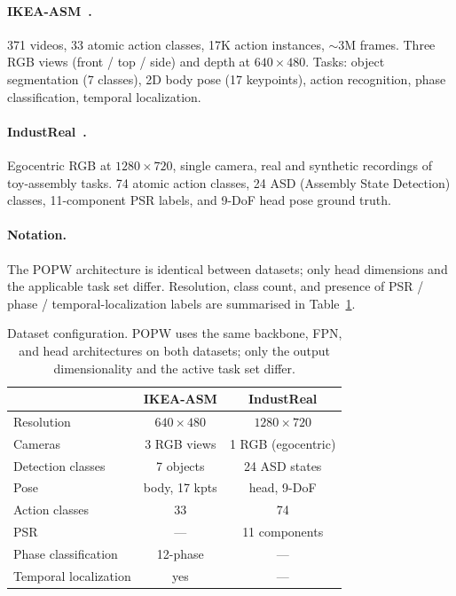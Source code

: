 \documentclass[11pt,a4paper]{article}
\newcommand{\popw}{POPW}
\newcommand{\ikea}{IKEA-ASM}
\newcommand{\industreal}{IndustReal}
\begin{document}
\paragraph{\ikea{}~\cite{benshabat2021ikea}.}
371 videos, 33 atomic action classes, 17K action instances, $\sim$3M frames.
Three RGB views (front / top / side) and depth at $640{\times}480$.
Tasks: object segmentation (7 classes), 2D body pose (17 keypoints), action recognition,
phase classification, temporal localization.

\paragraph{\industreal{}~\cite{schoonbeek2024industreal}.}
Egocentric RGB at $1280{\times}720$, single camera, real and synthetic recordings of
toy-assembly tasks. 74 atomic action classes, 24 ASD (Assembly State Detection) classes,
11-component PSR labels, and 9-DoF head pose ground truth.

\paragraph{Notation.}
The \popw{} architecture is identical between datasets; only head dimensions and the
applicable task set differ. Resolution, class count, and presence of PSR / phase /
temporal-localization labels are summarised in Table~\ref{tab:dataset-config}.

\begin{table}[!htbp]
\centering
\small
\caption{Dataset configuration. \popw{} uses the same backbone, FPN, and head architectures
on both datasets; only the output dimensionality and the active task set differ.}
\label{tab:dataset-config}
\begin{tabular}{l c c}
\toprule
& \ikea{} & \industreal{} \\
\midrule
Resolution                      & $640{\times}480$ & $1280{\times}720$ \\
Cameras                         & 3 RGB views      & 1 RGB (egocentric) \\
Detection classes               & 7 objects        & 24 ASD states \\
Pose                            & body, 17 kpts    & head, 9-DoF \\
Action classes                  & 33               & 74 \\
PSR                             & ---              & 11 components \\
Phase classification            & 12-phase         & --- \\
Temporal localization           & yes              & --- \\
\bottomrule
\end{tabular}
\end{table}
\end{document}
